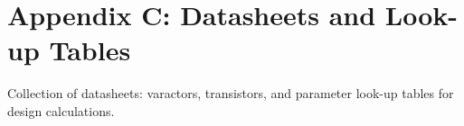 \chapter{Appendix C: Datasheets and Look-up Tables}
Collection of datasheets: varactors, transistors, and parameter look-up tables for design calculations.


